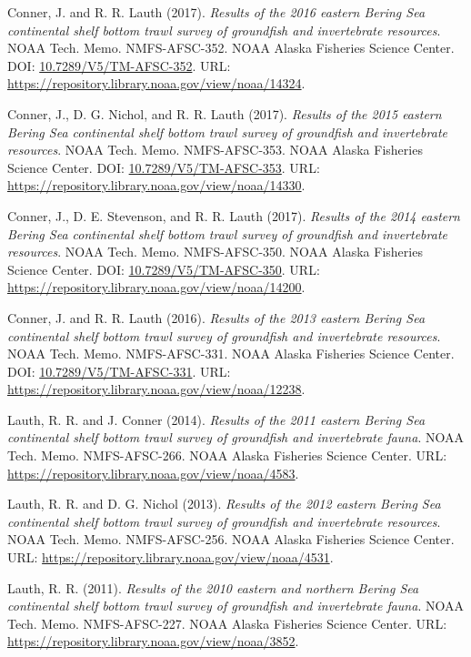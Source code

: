 \documentclass[
  letterpaper,
  oneside,
  open=any]{scrbook}
\begin{document}
Conner, J. and R. R. Lauth (2017). \emph{Results of the 2016 eastern
Bering Sea continental shelf bottom trawl survey of groundfish and
invertebrate resources}. NOAA Tech. Memo. NMFS-AFSC-352. NOAA Alaska
Fisheries Science Center. DOI:
\href{https://doi.org/10.7289\%2FV5\%2FTM-AFSC-352}{10.7289/V5/TM-AFSC-352}.
URL: \url{https://repository.library.noaa.gov/view/noaa/14324}.

Conner, J., D. G. Nichol, and R. R. Lauth (2017). \emph{Results of the
2015 eastern Bering Sea continental shelf bottom trawl survey of
groundfish and invertebrate resources}. NOAA Tech. Memo. NMFS-AFSC-353.
NOAA Alaska Fisheries Science Center. DOI:
\href{https://doi.org/10.7289\%2FV5\%2FTM-AFSC-353}{10.7289/V5/TM-AFSC-353}.
URL: \url{https://repository.library.noaa.gov/view/noaa/14330}.

Conner, J., D. E. Stevenson, and R. R. Lauth (2017). \emph{Results of
the 2014 eastern Bering Sea continental shelf bottom trawl survey of
groundfish and invertebrate resources}. NOAA Tech. Memo. NMFS-AFSC-350.
NOAA Alaska Fisheries Science Center. DOI:
\href{https://doi.org/10.7289\%2FV5\%2FTM-AFSC-350}{10.7289/V5/TM-AFSC-350}.
URL: \url{https://repository.library.noaa.gov/view/noaa/14200}.

Conner, J. and R. R. Lauth (2016). \emph{Results of the 2013 eastern
Bering Sea continental shelf bottom trawl survey of groundfish and
invertebrate resources}. NOAA Tech. Memo. NMFS-AFSC-331. NOAA Alaska
Fisheries Science Center. DOI:
\href{https://doi.org/10.7289\%2FV5\%2FTM-AFSC-331}{10.7289/V5/TM-AFSC-331}.
URL: \url{https://repository.library.noaa.gov/view/noaa/12238}.

Lauth, R. R. and J. Conner (2014). \emph{Results of the 2011 eastern
Bering Sea continental shelf bottom trawl survey of groundfish and
invertebrate fauna}. NOAA Tech. Memo. NMFS-AFSC-266. NOAA Alaska
Fisheries Science Center. URL:
\url{https://repository.library.noaa.gov/view/noaa/4583}.

Lauth, R. R. and D. G. Nichol (2013). \emph{Results of the 2012 eastern
Bering Sea continental shelf bottom trawl survey of groundfish and
invertebrate resources}. NOAA Tech. Memo. NMFS-AFSC-256. NOAA Alaska
Fisheries Science Center. URL:
\url{https://repository.library.noaa.gov/view/noaa/4531}.

Lauth, R. R. (2011). \emph{Results of the 2010 eastern and northern
Bering Sea continental shelf bottom trawl survey of groundfish and
invertebrate fauna}. NOAA Tech. Memo. NMFS-AFSC-227. NOAA Alaska
Fisheries Science Center. URL:
\url{https://repository.library.noaa.gov/view/noaa/3852}.
\end{document}
